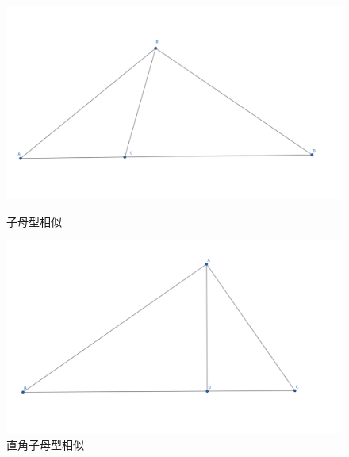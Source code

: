 \begin{figure}[H]
    \centering
    \hfill %
    \begin{minipage}[t]{0.45\textwidth}
    \centering
    \includegraphics[width=0.8\linewidth]{figures/子母型相似.png}
    \caption{子母型相似}
    \end{minipage}
    \hfill %
    \begin{minipage}[t]{0.45\textwidth}
    \centering
    \includegraphics[width=0.8\linewidth]{figures/射影定理.png}
    \caption{直角子母型相似}
    \end{minipage}
\end{figure}




